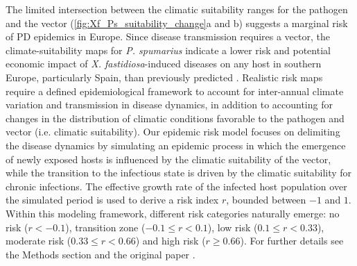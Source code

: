 The limited intersection between the climatic suitability ranges for the
pathogen and the vector (\cref{fig:Xf_Ps_suitability_change}a and b) suggests
a marginal  risk of PD epidemics in Europe. Since disease transmission requires
a vector, the climate-suitability maps for \textit{P. spumarius}  indicate a
lower risk and potential economic impact of \textit{X. fastidiosa}-induced
diseases on any host in southern Europe, particularly Spain, than previously
predicted \cite{Schneider2020}. Realistic risk maps require a defined
epidemiological framework to account for inter-annual climate variation and
transmission in disease dynamics, in addition to accounting for changes in the
distribution of climatic conditions favorable to the pathogen and vector (i.e.
climatic suitability). Our epidemic risk model focuses on delimiting the
disease dynamics by simulating an epidemic process in which the emergence of
newly exposed hosts is influenced by the climatic suitability of the vector,
while the transition to the infectious state is driven by the climatic
suitability for \xf{} chronic infections. The effective growth rate of the
infected host population over the simulated period is used to derive a risk
index $r$, bounded between $-1$ and $1$. Within this modeling framework,
different risk categories naturally emerge: no
risk ($r<-0.1$), transition zone ($-0.1\leq r<0.1$), low risk ($0.1\leq
    r<0.33$), moderate risk ($0.33\leq r<0.66$) and high risk ($r\geq0.66$).
For further details see the Methods section and the original paper
\cite{GimenezRomero2022_CommsBio}.

